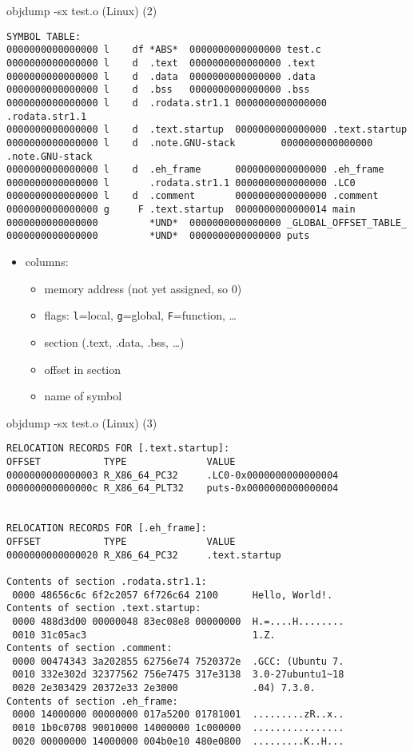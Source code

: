 \begin{frame}[fragile,label=objdumpSXO2]{objdump -sx test.o (Linux) (2)}
\begin{lstlisting}[language={},style=script]
SYMBOL TABLE:
0000000000000000 l    df *ABS*  0000000000000000 test.c
0000000000000000 l    d  .text  0000000000000000 .text
0000000000000000 l    d  .data  0000000000000000 .data
0000000000000000 l    d  .bss   0000000000000000 .bss
0000000000000000 l    d  .rodata.str1.1 0000000000000000 .rodata.str1.1
0000000000000000 l    d  .text.startup  0000000000000000 .text.startup
0000000000000000 l    d  .note.GNU-stack        0000000000000000 .note.GNU-stack
0000000000000000 l    d  .eh_frame      0000000000000000 .eh_frame
0000000000000000 l       .rodata.str1.1 0000000000000000 .LC0
0000000000000000 l    d  .comment       0000000000000000 .comment
0000000000000000 g     F .text.startup  0000000000000014 main
0000000000000000         *UND*  0000000000000000 _GLOBAL_OFFSET_TABLE_
0000000000000000         *UND*  0000000000000000 puts
\end{lstlisting}
\begin{itemize}
\item columns:
    \begin{itemize}
    \item memory address (not yet assigned, so 0)
    \item flags: \texttt{l}=local, \texttt{g}=global, \texttt{F}=function, \ldots
    \item section (.text, .data, .bss, \ldots)
    \item offset in section
    \item name of symbol
    \end{itemize}
\end{itemize}
\end{frame}

\begin{frame}[fragile,label=objdumpSXO3]{objdump -sx test.o (Linux) (3)}
\begin{lstlisting}[language={},style=script]
RELOCATION RECORDS FOR [.text.startup]:
OFFSET           TYPE              VALUE 
0000000000000003 R_X86_64_PC32     .LC0-0x0000000000000004
000000000000000c R_X86_64_PLT32    puts-0x0000000000000004


RELOCATION RECORDS FOR [.eh_frame]:
OFFSET           TYPE              VALUE 
0000000000000020 R_X86_64_PC32     .text.startup

Contents of section .rodata.str1.1:
 0000 48656c6c 6f2c2057 6f726c64 2100      Hello, World!.  
Contents of section .text.startup:
 0000 488d3d00 00000048 83ec08e8 00000000  H.=....H........
 0010 31c05ac3                             1.Z.            
Contents of section .comment:
 0000 00474343 3a202855 62756e74 7520372e  .GCC: (Ubuntu 7.
 0010 332e302d 32377562 756e7475 317e3138  3.0-27ubuntu1~18
 0020 2e303429 20372e33 2e3000             .04) 7.3.0.     
Contents of section .eh_frame:
 0000 14000000 00000000 017a5200 01781001  .........zR..x..
 0010 1b0c0708 90010000 14000000 1c000000  ................
 0020 00000000 14000000 004b0e10 480e0800  .........K..H...
\end{lstlisting}
\end{frame}
